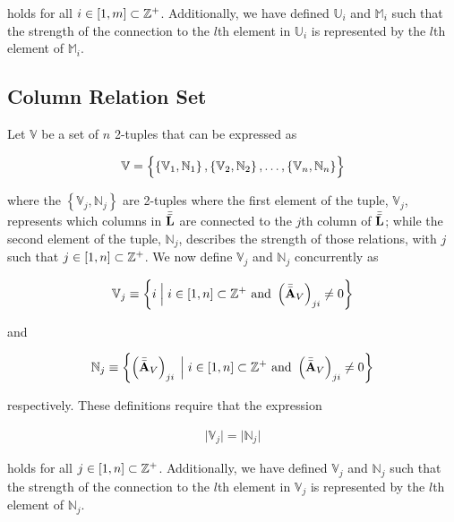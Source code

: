 \documentclass[../../ClusteringConnectionsMAIN.tex]{subfiles}
\begin{document}
\begin{flushleft}
\begin{large}
holds for all $i \in \left[ 1, m \right] \subset \mathbb{Z}^+$.  Additionally, we have defined $\mathbb{U}_i$ and $\mathbb{M}_i$ such that the strength of the connection to the $l$th element in $\mathbb{U}_i$ is represented by the $l$th element of $\mathbb{M}_i$.


\subsection{Column Relation Set}

Let $\mathbb{V}$ be a set of $n$ 2-tuples that can be expressed as

\begin{align*}
\mathbb{V} = \Bigl\{ \left\{ \mathbb{V}_1, \mathbb{N}_1 \right\}, \left\{ \mathbb{V}_2, \mathbb{N}_2 \right\}, \dots, \left\{ \mathbb{V}_n, \mathbb{N}_n \right\} \Bigr\}
\end{align*}

where the $\left\{ \mathbb{V}_j, \mathbb{N}_j \right\}$ are 2-tuples where the first element of the tuple, $\mathbb{V}_j$, represents which columns in $\bar{\bar{\mathbf{L}}}$ are connected to the $j$th column of $\bar{\bar{\mathbf{L}}}$; while the second element of the tuple, $\mathbb{N}_j$, describes the strength of those relations, with $j$ such that $j \in \left[ 1, n \right] \subset \mathbb{Z}^+$.  We now define $\mathbb{V}_j$ and $\mathbb{N}_j$ concurrently as

\begin{align}
\mathbb{V}_j \equiv \left\{ i \; \Bigl| \Bigr. \; i \in \left[ 1, n \right] \subset \mathbb{Z}^+ \text{  and  } \left( \bar{\bar{\mathbf{A}}}_V \right)_{ji} \neq 0 \right\}
\end{align}

and

\begin{align}
\mathbb{N}_j \equiv \left\{ \left( \bar{\bar{\mathbf{A}}}_V \right)_{ji} \; \Bigl| \Bigr. \; i \in \left[ 1, n \right] \subset \mathbb{Z}^+ \text{  and  } \left( \bar{\bar{\mathbf{A}}}_V \right)_{ji} \neq 0 \right\}
\end{align}

respectively.  These definitions require that the expression

\begin{align*}
\bigl| \mathbb{V}_j \bigr| = \bigl| \mathbb{N}_j \bigr|
\end{align*}

holds for all $j \in \left[ 1, n \right] \subset \mathbb{Z}^+$.  Additionally, we have defined $\mathbb{V}_j$ and $\mathbb{N}_j$ such that the strength of the connection to the $l$th element in $\mathbb{V}_j$ is represented by the $l$th element of $\mathbb{N}_j$.


\end{large}
\end{flushleft}
\end{document}
